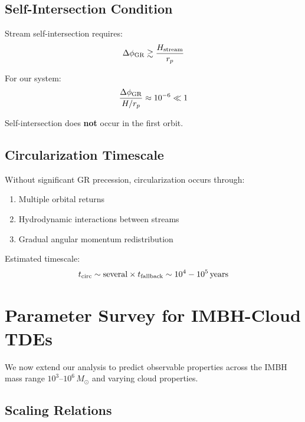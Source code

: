 \documentclass[twocolumn,amsmath,amssymb,prd,superscriptaddress,nofootinbib]{revtex4-2}
\begin{document}
\subsection{Self-Intersection Condition}
\label{sec:self_intersection}

Stream self-intersection requires:
\begin{equation}
    \Delta\phi_{\rm GR} \gtrsim \frac{H_{\rm stream}}{r_p}
    \label{eq:self_int}
\end{equation}

For our system:
\begin{equation}
    \frac{\Delta\phi_{\rm GR}}{H/r_p} \approx 10^{-6} \ll 1
\end{equation}

Self-intersection does \textbf{not} occur in the first orbit.

\subsection{Circularization Timescale}
\label{sec:t_circ}

Without significant GR precession, circularization occurs through:
\begin{enumerate}
    \item Multiple orbital returns
    \item Hydrodynamic interactions between streams
    \item Gradual angular momentum redistribution
\end{enumerate}

Estimated timescale:
\begin{equation}
    t_{\rm circ} \sim \text{several} \times t_{\rm fallback} \sim 10^4 - 10^5\,{\rm years}
    \label{eq:t_circ}
\end{equation}

\section{Parameter Survey for IMBH-Cloud TDEs}
\label{sec:parameter_survey}

We now extend our analysis to predict observable properties across the IMBH mass range $10^3$--$10^6\,M_\odot$ and varying cloud properties.

\subsection{Scaling Relations}
\label{sec:scaling}
\end{document}
